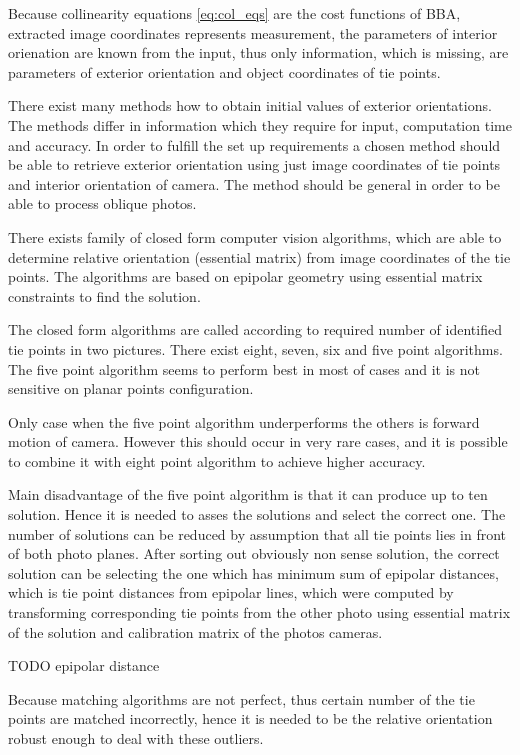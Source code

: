 \documentclass[a4paper,12pt]{article}
\begin{document}
Because collinearity equations \ref{eq:col_eqs} are the cost functions of BBA,
extracted image coordinates represents measurement,
the parameters of interior orienation are known from the input, thus only information, 
which is missing, are parameters of exterior orientation and object coordinates of 
tie points. 

There exist many methods how to obtain initial values of exterior orientations. The methods 
differ in information which they require for input, computation time and accuracy. 
In order to fulfill the set up requirements a chosen method should be able to retrieve exterior orientation 
using just image coordinates of tie points and interior orientation of camera. The method 
should be general in order to be able to process oblique photos.

There exists family of closed form computer vision algorithms,
which are able to determine relative orientation (essential matrix) from image coordinates 
of the tie points. The algorithms are based on epipolar geometry using essential matrix 
constraints to find the solution. 

The closed form algorithms are called 
according to required number of identified tie points in two pictures.
There exist eight, seven, six and five point algorithms. The five point algorithm seems to perform best in most
of cases \cite{stewenius2006recent} and it is not sensitive on planar points configuration.

Only case when the five point algorithm \cite{nister2004efficient} underperforms 
\cite{bruckner2008experimental} the others is forward motion of camera.
However this should occur in very rare cases, and it is possible 
to combine it with eight point algorithm to achieve higher accuracy.

Main disadvantage of the five point algorithm is that it can produce up to ten solution.
Hence it is needed to asses the solutions and select the correct one. The number of solutions
can be reduced by assumption that all tie points lies in front of both photo 
planes. After sorting out obviously non sense solution,
 the correct solution can be selecting the one which has minimum sum of epipolar distances, which is tie point distances
 from epipolar lines, which were computed by transforming corresponding tie points from the other photo
 using essential matrix of the solution and calibration matrix of the photos cameras.  

 TODO epipolar distance
 
Because matching algorithms are not perfect, thus  certain number of the tie points are matched 
incorrectly, hence it is needed to be the relative orientation robust enough to
deal with these outliers.
\end{document}
